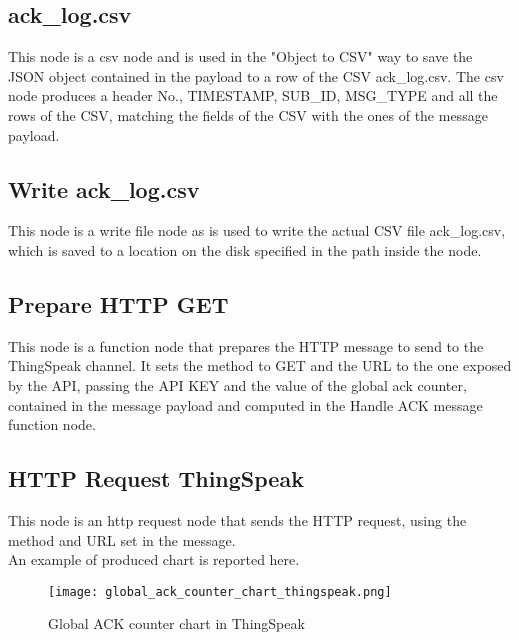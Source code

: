 \subsection{ack\_log.csv}
This node is a csv node and is used in the "Object to CSV" way to save the JSON object contained in the payload to a row of the CSV ack\_log.csv. The csv node produces a header No., TIMESTAMP, SUB\_ID, MSG\_TYPE and all the rows of the CSV, matching the fields of the CSV with the ones of the message payload.

\subsection{Write ack\_log.csv}
This node is a write file node as is used to write the actual CSV file ack\_log.csv, which is saved to a location on the disk specified in the path inside the node.

\subsection{Prepare HTTP GET}
This node is a function node that prepares the HTTP message to send to the ThingSpeak channel. It sets the method to GET and the URL to the one exposed by the API, passing the API KEY and the value of the global ack counter, contained in the message payload and computed in the Handle ACK message function node.

\subsection{HTTP Request ThingSpeak}
This node is an http request node that sends the HTTP request, using the method and URL set in the message.\\
An example of produced chart is reported here.
\begin{figure}[H]
    \centering
    \texttt{[image: global\_ack\_counter\_chart\_thingspeak.png]}
    \caption{Global ACK counter chart in ThingSpeak}
\end{figure}



